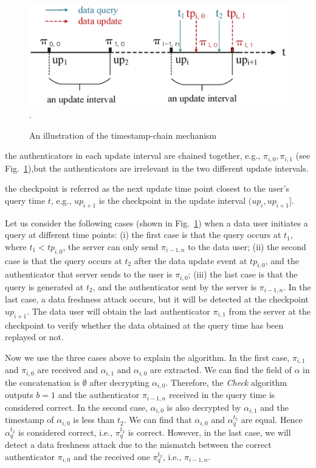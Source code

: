\begin{figure}[htb]
  \centering
  \includegraphics[width=6 in]{fig/timestamp}
  \DeclareGraphicsExtensions.
  \caption{An illustration of the timestamp-chain mechanism}
  \label{fig:timestamp}
\end{figure}

the authenticators in each update interval are chained together, e.g., $\pi_{i, 0}, \pi_{i, 1}$ (see Fig.~\ref{fig:timestamp}),but the authenticators are irrelevant in the two different update intervals.

the checkpoint is referred as the next update time point closest to the user's query time $t$, e.g., $up_{i+1}$ is the checkpoint in the update interval $(up_i,up_{i+1}]$.


Let us consider the following cases (shown in Fig.~\ref{fig:timestamp}) when a data user initiates a query at different time points: (i) the first case is that the query occurs at $t_1$, where $t_1 < tp_{i, 0}$, the server can only send $\pi_{i-1, n}$ to the data user; (ii) the second case is that the query occurs at $t_2$ after the data update event at $tp_{i, 0}$, and the authenticator that server sends to the user is $\pi_{i, 0}$; (iii) the last case is that the query is generated at $t_2$, and the authenticator sent by the server is $\pi_{i-1, n}$. In the last case, a data freshness attack occurs, but it will be detected at the checkpoint $up_{i+1}$. The data user will obtain the last authenticator $\pi_{i, 1}$ from the server at the checkpoint to verify whether the data obtained at the query time has been replayed or not.

Now we use the three cases above to explain the algorithm. In the first case, $\pi_{i, 1}$ and $\pi_{i, 0}$ are received and $\alpha_{i,1}$ and $\alpha_{i,0}$ are extracted. We can find the field of $\alpha$ in the concatenation is $\emptyset$ after decrypting $\alpha_{i, 0}$. Therefore, the {\it Check} algorithm outputs $b=1$ and the authenticator $\pi_{i-1, n}$ received in the query time is considered correct. In the second case, $\alpha_{i, 0}$ is also decrypted by $\alpha_{i, 1}$ and the timestamp of $\alpha_{i, 0}$ is less than $t_2$. We can find that $\alpha_{i, 0}$ and $\alpha^{t_2}_q$ are equal. Hence $\alpha^{t_2}_q$ is considered correct, i.e., $\pi^{t_2}_q$ is correct. However, in the last case, we will detect a data freshness attack due to the mismatch between the correct authenticator $\pi_{i, 0}$ and the received one $\pi^{t_2}_q$, i.e., $\pi_{i-1, n}$.

